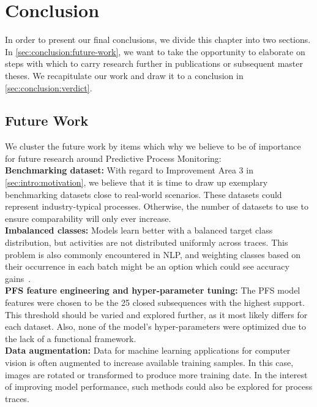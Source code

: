 \chapter{Conclusion} \label{chap:conclusion}
In order to present our final conclusions, we divide this chapter into two sections.
In \autoref{sec:conclusion:future-work}, we want to take the opportunity to elaborate on steps with which to carry research further in publications or subsequent master theses.
We recapitulate our work and draw it to a conclusion in \autoref{sec:conclusion:verdict}.

\section{Future Work} \label{sec:conclusion:future-work}
We cluster the future work by items which why we believe to be of importance for future research around Predictive Process Monitoring:\\

\noindent\textbf{Benchmarking dataset:} With regard to Improvement Area 3 in \autoref{sec:intro:motivation}, we believe that it is time to draw up exemplary benchmarking datasets close to real-world scenarios. These datasets could represent industry-typical processes. Otherwise, the number of datasets to use to ensure comparability will only ever increase.\\

\noindent\textbf{Imbalanced classes:} Models learn better with a balanced target class distribution, but activities are not distributed uniformly across traces. This problem is also commonly encountered in NLP, and weighting classes based on their occurrence in each batch might be an option which could see accuracy gains~\cite{web:stackoverflow-keras-class-weights}.\\

\noindent\textbf{PFS feature engineering and hyper-parameter tuning:} The PFS model features were chosen to be the 25 closed subsequences with the highest support. This threshold should be varied and explored further, as it most likely differs for each dataset. Also, none of the model's hyper-parameters were optimized due to the lack of a functional framework.\\

\noindent\textbf{Data augmentation:} Data for machine learning applications for computer vision is often augmented to increase available training samples. In this case, images are rotated or transformed to produce more training date. In the interest of improving model performance, such methods could also be explored for process traces.\\

